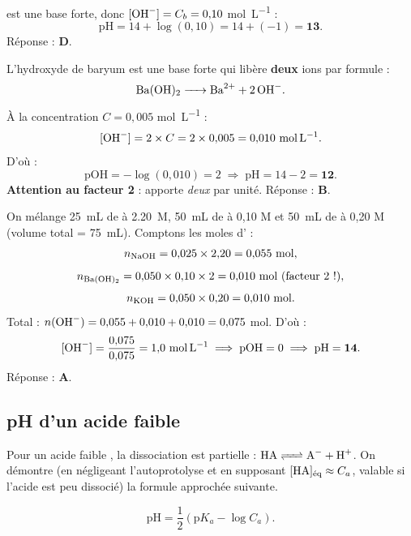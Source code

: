 \documentclass[11pt,a4paper]{article}
\begin{document}
\begin{exemple}
 est une base forte, donc $[\ce{OH-}] = C_b = 0{,}10$ \si{mol.L^{-1}} :
\[ \mathrm{pH} = 14 + \log(0{,}10) = 14 + (-1) = \mathbf{13}. \]
Réponse : \textbf{D}.
\end{exemple}

\begin{exemple}
L'hydroxyde de baryum  est une base forte qui libère \textbf{deux} ions  par formule :
\[ \ce{Ba(OH)2 -> Ba^{2+} + 2 OH-}. \]
À la concentration $C = 0{,}005$ \si{mol.L^{-1}} :
\[ [\ce{OH-}] = 2 \times C = 2 \times 0{,}005 = 0{,}010\ \si{mol.L^{-1}}. \]
D'où :
\[ \mathrm{pOH} = -\log(0{,}010) = 2 \;\Longrightarrow\; \mathrm{pH} = 14 - 2 = \mathbf{12}. \]
\textbf{Attention au facteur 2} :  apporte \emph{deux}  par unité. Réponse : \textbf{B}.
\end{exemple}

\begin{exemple}
On mélange \SI{25}{mL} de  à \SI{2,20}{M}, \SI{50}{mL} de  à 0,10 M et \SI{50}{mL} de
 à 0,20 M (volume total = \SI{75}{mL}). Comptons les moles d' :
\[ n_{\ce{NaOH}} = 0{,}025 \times 2{,}20 = 0{,}055\ \si{mol}, \]
\[ n_{\ce{Ba(OH)2}} = 0{,}050 \times 0{,}10 \times 2 = 0{,}010\ \si{mol}\ (\text{facteur 2 !}), \]
\[ n_{\ce{KOH}} = 0{,}050 \times 0{,}20 = 0{,}010\ \si{mol}. \]
Total : $n(\ce{OH-}) = 0{,}055 + 0{,}010 + 0{,}010 = 0{,}075$ \si{mol}. D'où :
\[ [\ce{OH-}] = \frac{0{,}075}{0{,}075} = 1{,}0\ \si{mol.L^{-1}} \;\Longrightarrow\; \mathrm{pOH} = 0
   \;\Longrightarrow\; \mathrm{pH} = \mathbf{14}. \]
Réponse : \textbf{A}.
\end{exemple}

\subsection{pH d'un acide faible}

Pour un acide faible , la dissociation est partielle : $\ce{HA <=> A- + H+}$. On démontre (en
négligeant l'autoprotolyse et en supposant $[\ce{HA}]_{\text{éq}} \approx C_a$, valable si l'acide est peu
dissocié) la formule approchée suivante.

\begin{formule}
\[ \boxed{\mathrm{pH} = \frac{1}{2}\left(\mathrm{p}K_a - \log C_a\right)}. \]
\end{formule}
\end{document}
